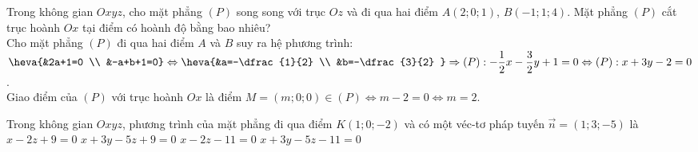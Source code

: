 \begin{bt}%
  
	Trong không gian $Oxyz$, cho mặt phẳng $(P)$ song song với trục $Oz$ và đi qua hai điểm $A(2; 0; 1)$, $B(-1; 1; 4)$. Mặt phẳng $(P)$ cắt trục hoành $Ox$ tại điểm có hoành độ bằng bao nhiêu?
		\\
		 Cho mặt phẳng $(P)$ đi qua hai điểm $A$ và $B$ suy ra hệ phương trình:\\
		 $\heva{&2a+1=0 \\ &-a+b+1=0} \Leftrightarrow \heva{&a=-\dfrac{1}{2} \\ &b=-\dfrac{3}{2} }\Rightarrow (P): -\dfrac{1}{2}x-\dfrac{3}{2}y+1=0 \Leftrightarrow (P): x+3y-2=0$.\\
		 Giao điểm của $(P)$ với trục hoành $Ox$ là điểm $M=(m;0;0) \in (P) \Leftrightarrow m-2=0 \Leftrightarrow m=2$.

\end{bt}

\begin{ex}%
	Trong không gian $Oxyz$, phương trình của mặt phẳng đi qua điểm $K(1;0;-2)$ và có một véc-tơ pháp tuyến $\overrightarrow{n}=(1;3;-5)$  là
	\choice 
		{$x-2z+9=0$} 
		{$x+3y-5z+9=0$} 
		 {$x-2z-11=0$}
		{\True $x+3y-5z-11=0$} 
\end{ex}
